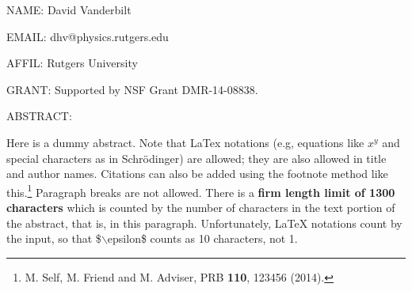 
NAME: David Vanderbilt

EMAIL: dhv@physics.rutgers.edu

AFFIL: Rutgers University



GRANT: Supported by NSF Grant DMR-14-08838.

ABSTRACT:

Here is a dummy abstract.  Note that LaTex notations (e.g,
equations like $x^y$ and special characters as in Schr\"odinger)
are allowed; they are also allowed in title and author names.
Citations can also be added using the footnote method
like this.\footnote{M. Self, M. Friend and M. Adviser,
PRB {\bf 110}, 123456 (2014).}
Paragraph breaks are not allowed.  There is a {\bf firm length limit of
1300 characters} which is counted by the number of characters in
the text portion of the abstract, that is, in this paragraph.
Unfortunately, LaTeX notations count by the input, so that
\$$\backslash$epsilon\$ counts as 10 characters, not 1.


